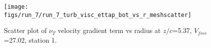 \begin{figure}[H]
\centering
\texttt{[image: figs/run\_7/run\_7\_turb\_visc\_ettap\_bot\_vs\_r\_meshscatter]}
\caption{Scatter plot of $\nu_T$ velocity gradient term vs radius at $z/c$=5.37, $V_{free}$=27.02, station 1.}
\label{fig:run_7_turb_visc_ettap_bot_vs_r_meshscatter}
\end{figure}


